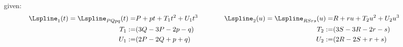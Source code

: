 given:
$$\begin{aligned}
    \Lspline_1(t) = \Lspline_{PQpq}(t) =& P + pt + T_1t^2 + U_1t^3 & \hspace{1cm}
    \Lspline_2(u) = \Lspline_{RSrs}(u) =& R + ru + T_2u^2 + U_2u^3 \\
    T_1 :=& (3Q-3P-2p-q) & \hspace{1cm}
    T_2 :=& (3S-3R-2r-s) \\
    U_1 :=& (2P-2Q+p+q)  & \hspace{1cm}
    U_2 :=& (2R-2S+r+s) \\
\end{aligned}$$
